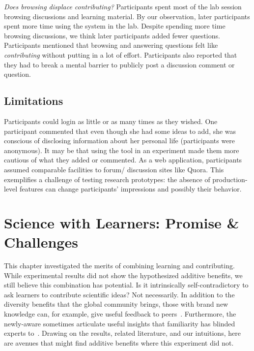 \textit{Does browsing displace contributing?}
Participants spent most of the lab session browsing discussions and learning material. By our observation, later participants spent more time using the system in the lab. Despite spending more time browsing discussions, we think later participants added fewer questions. Participants mentioned that browsing and answering questions felt like \textit{contributing} without putting in a lot of effort. Participants also reported that they had to break a mental barrier to publicly post a discussion comment or question. 

\subsection*{Limitations}
Participants could login as little or as many times as they wished. One participant commented that even though she had some ideas to add, she was conscious of disclosing information about her personal life (participants were anonymous). It may be that using the tool in an experiment made them more cautious of what they added or commented.
As a web application, participants assumed comparable facilities to forum/ discussion sites like Quora. This exemplifies a challenge of testing research prototypes: the absence of production-level features can change participants’ impressions and possibly their behavior.

\section{Science with Learners: Promise \& Challenges}
This chapter investigated the merits of combining learning and contributing. While experimental results did not show the hypothesized additive benefits, we still believe this combination has potential. Is it intrinsically self-contradictory to ask learners to contribute scientific ideas? Not necessarily. In addition to the diversity benefits that the global community brings, those with brand new knowledge can, for example, give useful feedback to peers~\cite{Kulkarni2013peer}. Furthermore, the newly-aware sometimes articulate useful insights that familiarity has blinded experts to~\cite{Hinds1999}. Drawing on the results, related literature, and our intuitions, here are avenues that might find additive benefits where this experiment did not.

